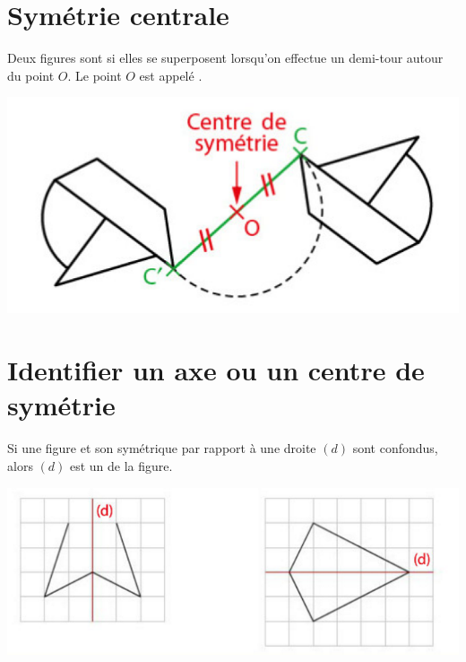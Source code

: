 \documentclass[xcolor={dvipsnames}]{beamer}
\begin{document}
\section{Symétrie centrale}


\begin{frame}
	\begin{mydef}
		
		Deux figures sont  si elles se superposent lorsqu'on effectue un demi-tour autour du point $O$. Le point $O$ est appelé .\pause
		
	\end{mydef}
	
	\begin{myex}
		\begin{center}
			\includegraphics[scale=.5]{fig2}
		\end{center}
	\end{myex}
\end{frame}

\section{Identifier un axe ou un centre de symétrie}

\begin{frame}
	\begin{mydef}
		
		Si une figure et son symétrique \pause par rapport à une droite $(d)$ sont confondus, alors \pause $(d)$ est un  de la figure.\pause 
		
		
	\end{mydef}
	
	\begin{myexs}
		\begin{center}
			\includegraphics[scale=0.65]{axes}
		\end{center}
	\end{myexs}
\end{frame}
\end{document}
